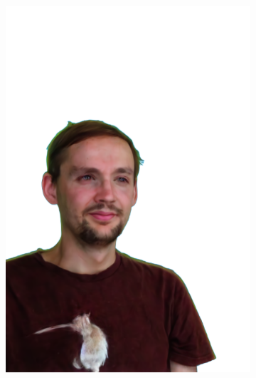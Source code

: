 \begin{figure}[ht]
\begin{subfigure}{0.08\linewidth}
        \includegraphics[width=\textwidth]{Figures/results/low/simon_rabbit/11_render.png}
	\end{subfigure}
    \begin{subfigure}{0.08\linewidth}%

\end{subfigure}
\end{figure}
